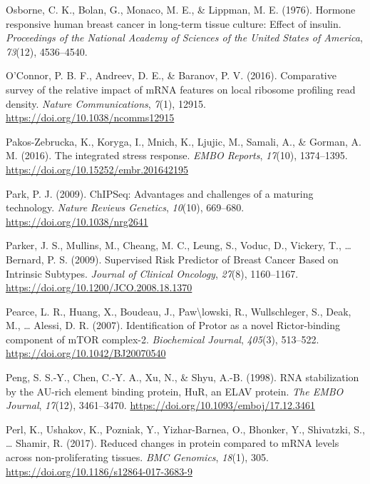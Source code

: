 \documentclass[12pt,openany]{book}
\begin{document}
\hypertarget{ref-Osborne1976}{}
Osborne, C. K., Bolan, G., Monaco, M. E., \& Lippman, M. E. (1976).
Hormone responsive human breast cancer in long-term tissue culture:
Effect of insulin. \emph{Proceedings of the National Academy of Sciences
of the United States of America}, \emph{73}(12), 4536--4540.

\hypertarget{ref-OConnor2016}{}
O'Connor, P. B. F., Andreev, D. E., \& Baranov, P. V. (2016).
Comparative survey of the relative impact of mRNA features on local
ribosome profiling read density. \emph{Nature Communications},
\emph{7}(1), 12915. \url{https://doi.org/10.1038/ncomms12915}

\hypertarget{ref-Pakos-Zebrucka2016}{}
Pakos-Zebrucka, K., Koryga, I., Mnich, K., Ljujic, M., Samali, A., \&
Gorman, A. M. (2016). The integrated stress response. \emph{EMBO
Reports}, \emph{17}(10), 1374--1395.
\url{https://doi.org/10.15252/embr.201642195}

\hypertarget{ref-Park2009}{}
Park, P. J. (2009). ChIPSeq: Advantages and challenges of a maturing
technology. \emph{Nature Reviews Genetics}, \emph{10}(10), 669--680.
\url{https://doi.org/10.1038/nrg2641}

\hypertarget{ref-Parker2009}{}
Parker, J. S., Mullins, M., Cheang, M. C., Leung, S., Voduc, D.,
Vickery, T., \ldots{} Bernard, P. S. (2009). Supervised Risk Predictor
of Breast Cancer Based on Intrinsic Subtypes. \emph{Journal of Clinical
Oncology}, \emph{27}(8), 1160--1167.
\url{https://doi.org/10.1200/JCO.2008.18.1370}

\hypertarget{ref-Pearce2007}{}
Pearce, L. R., Huang, X., Boudeau, J., Paw\textbackslash{}lowski, R.,
Wullschleger, S., Deak, M., \ldots{} Alessi, D. R. (2007).
Identification of Protor as a novel Rictor-binding component of mTOR
complex-2. \emph{Biochemical Journal}, \emph{405}(3), 513--522.
\url{https://doi.org/10.1042/BJ20070540}

\hypertarget{ref-Peng1998}{}
Peng, S. S.-Y., Chen, C.-Y. A., Xu, N., \& Shyu, A.-B. (1998). RNA
stabilization by the AU-rich element binding protein, HuR, an ELAV
protein. \emph{The EMBO Journal}, \emph{17}(12), 3461--3470.
\url{https://doi.org/10.1093/emboj/17.12.3461}

\hypertarget{ref-Perl2017}{}
Perl, K., Ushakov, K., Pozniak, Y., Yizhar-Barnea, O., Bhonker, Y.,
Shivatzki, S., \ldots{} Shamir, R. (2017). Reduced changes in protein
compared to mRNA levels across non-proliferating tissues. \emph{BMC
Genomics}, \emph{18}(1), 305.
\url{https://doi.org/10.1186/s12864-017-3683-9}
\end{document}
